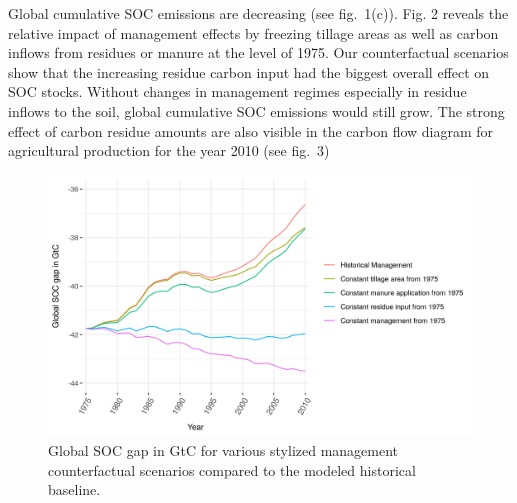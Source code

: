 \documentclass[gc, manuscript]{copernicus}
\begin{document}
Global cumulative SOC emissions are decreasing (see fig.~1(c)). Fig. 2 reveals the relative impact of management effects by freezing tillage areas as well as carbon inflows from residues or manure at the level of 1975. Our counterfactual scenarios show that the increasing residue carbon input had the biggest overall effect on SOC stocks. Without changes in management regimes especially in residue inflows to the soil, global cumulative SOC emissions would still grow. The strong effect of carbon residue amounts are also visible in the carbon flow diagram for agricultural production for the year 2010 (see fig.~3)

\begin{figure}[H]
\includegraphics[width=18cm]{../ResultNotebooks/Output/Images/scenario} \caption{Global SOC gap in GtC for various stylized management counterfactual scenarios compared to the modeled historical baseline.}\label{fig:SOCscen}
\end{figure}
\end{document}
